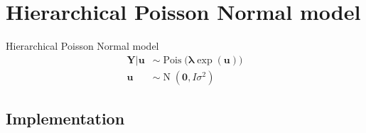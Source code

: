 \documentclass[aspectratio=169]{beamer}
\DeclareMathOperator{\N}{N}
\DeclareMathOperator{\Pois}{Pois}
\begin{document}
\hypertarget{hierarchical-poisson-normal-model}{%
\section{Hierarchical Poisson Normal
model}\label{hierarchical-poisson-normal-model}}

\begin{frame}{Hierarchical Poisson Normal model}
\begin{subequations} \label{eq:PoisN}
  \begin{alignat}{2}
    \boldsymbol{Y|u} &\sim \Pois \big( \boldsymbol{\lambda} \exp(\boldsymbol{u}) \big) \label{eq:pois_n0} \\ 
    \boldsymbol{u} &\sim \N(\boldsymbol{0},I\sigma^2) \label{eq:pois_n1}
  \end{alignat}
\end{subequations}
\end{frame}

\hypertarget{implementation}{%
\subsection{Implementation}\label{implementation}}
\end{document}
